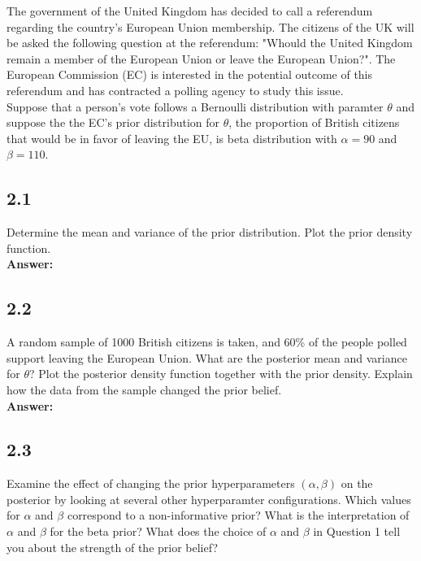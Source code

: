 \documentclass[a4paper]{article}
\begin{document}
The government of the United Kingdom has decided to call a referendum regarding the country's European Union membership. The citizens of the UK will be asked the following question at the referendum: "Whould the United Kingdom remain a member of the European Union or leave the European Union?". The European Commission (EC) is interested in the potential outcome of this referendum and has contracted a polling agency to study this issue.\\
Suppose that a person's vote follows a Bernoulli distribution with paramter $\theta$ and suppose the the EC's prior distribution for $\theta$, the proportion of British citizens that would be in favor of leaving the EU, is beta distribution with $\alpha = 90$ and $\beta = 110$.


\subsection*{2.1}

Determine the mean and variance of the prior distribution. Plot the prior density function.\\

\textbf{Answer:}\\





\subsection*{2.2}

A random sample of 1000 British citizens is taken, and 60\% of the people polled support leaving the European Union. What are the posterior mean and variance for $\theta$? Plot the posterior density function together with the prior density. Explain how the data from the sample changed the prior belief.\\

\textbf{Answer:}\\





\subsection*{2.3}

Examine the effect of changing the prior hyperparameters $(\alpha, \beta)$ on the posterior by looking at several other hyperparamter configurations. Which values for $\alpha$ and $\beta$ correspond to a non-informative prior? What is the interpretation of $\alpha$ and $\beta$ for the beta prior? What does the choice of $\alpha$ and $\beta$ in Question 1 tell you about the strength of the prior belief?\\
\end{document}
